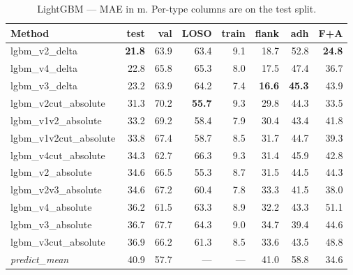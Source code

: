 \documentclass[11pt,a4paper]{article}
\begin{document}
\begin{table}[h]
\centering
\caption{LightGBM --- MAE in \textmu m. Per-type columns are on the test split.}
\label{tab:lgbm}
\small
\begin{tabular}{lrrrr|rrr}
\toprule
Method                  & test & val & LOSO & train & flank & adh & F+A \\
\midrule
lgbm\_v2\_delta         & \textbf{21.8} & 63.9 & 63.4 & 9.1 & 18.7 & 52.8 & \textbf{24.8} \\
lgbm\_v4\_delta         & 22.8 & 65.8 & 65.3 & 8.0 & 17.5 & 47.4 & 36.7 \\
lgbm\_v3\_delta         & 23.2 & 63.9 & 64.2 & 7.4 & \textbf{16.6} & \textbf{45.3} & 43.9 \\
lgbm\_v2cut\_absolute   & 31.3 & 70.2 & \textbf{55.7} & 9.3 & 29.8 & 44.3 & 33.5 \\
lgbm\_v1v2\_absolute    & 33.2 & 69.2 & 58.4 & 7.9 & 30.4 & 43.4 & 41.8 \\
lgbm\_v1v2cut\_absolute & 33.8 & 67.4 & 58.7 & 8.5 & 31.7 & 44.7 & 39.3 \\
lgbm\_v4cut\_absolute   & 34.3 & 62.7 & 66.3 & 9.3 & 31.4 & 45.9 & 42.8 \\
lgbm\_v2\_absolute      & 34.6 & 66.5 & 55.3 & 8.7 & 31.5 & 44.5 & 44.3 \\
lgbm\_v2v3\_absolute    & 34.6 & 67.2 & 60.4 & 7.8 & 33.3 & 41.5 & 38.0 \\
lgbm\_v4\_absolute      & 36.2 & 61.5 & 63.3 & 8.9 & 32.2 & 43.3 & 51.1 \\
lgbm\_v3\_absolute      & 36.7 & 67.7 & 64.3 & 9.0 & 34.7 & 39.4 & 44.6 \\
lgbm\_v3cut\_absolute   & 36.9 & 66.2 & 61.3 & 8.5 & 33.6 & 43.5 & 48.8 \\
\midrule
\emph{predict\_mean}    & 40.9 & 57.7 & --- & --- & 41.0 & 58.8 & 34.6 \\
\bottomrule
\end{tabular}
\end{table}
\end{document}
